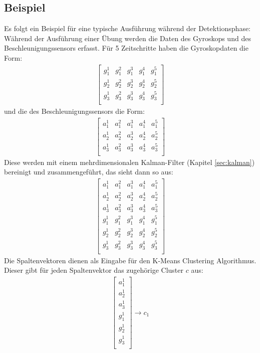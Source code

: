 \documentclass{article}
\begin{document}
\subsection{Beispiel}
Es folgt ein Beispiel für eine typische Ausführung während der Detektionsphase:\\
Während der Ausführung einer Übung werden die Daten des Gyroskops und des Beschleunigungssensors erfasst.
Für 5 Zeitschritte haben die Gyroskopdaten die Form:
\begin{align*}
\left[\begin{array}{rrrrr}
g_{1}^1 & g_{1}^2 & g_{1}^3 & g_{1}^4 & g_{1}^5 \\
g_{2}^1 & g_{2}^2 & g_{2}^3 & g_{2}^4 & g_{2}^5 \\
g_{3}^1 & g_{3}^2 & g_{3}^3 & g_{3}^4 & g_{3}^5 \\
\end{array}\right]
\end{align*}
und die des Beschleunigungssensors die Form:
\begin{align*}
\left[\begin{array}{rrrrr}
a_{1}^1 & a_{1}^2 & a_{1}^3 & a_{1}^4 & a_{1}^5 \\
a_{2}^1 & a_{2}^2 & a_{2}^3 & a_{2}^4 & a_{2}^5 \\
a_{3}^1 & a_{3}^2 & a_{3}^3 & a_{3}^4 & a_{3}^5 \\
\end{array}\right]
\end{align*}
Diese werden mit einem mehrdimensionalen Kalman-Filter (Kapitel \ref{sec:kalman}) bereinigt und zusammengeführt, das sieht dann so aus:
\begin{align*}
\left[\begin{array}{rrrrr}
a_{1}^1 & a_{1}^2 & a_{1}^3 & a_{1}^4 & a_{1}^5 \\
a_{2}^1 & a_{2}^2 & a_{2}^3 & a_{2}^4 & a_{2}^5 \\
a_{3}^1 & a_{3}^2 & a_{3}^3 & a_{3}^4 & a_{3}^5 \\
g_{1}^1 & g_{1}^2 & g_{1}^3 & g_{1}^4 & g_{1}^5 \\
g_{2}^1 & g_{2}^2 & g_{2}^3 & g_{2}^4 & g_{2}^5 \\
g_{3}^1 & g_{3}^2 & g_{3}^3 & g_{3}^4 & g_{3}^5 \\
\end{array}\right]
\end{align*}
Die Spaltenvektoren dienen als Eingabe für den K-Means Clustering Algorithmus.
Dieser gibt für jeden Spaltenvektor das zugehörige Cluster $c$ aus:
\begin{align*}
\left[\begin{array}{r}
a_{1}^1\\
a_{2}^1\\
a_{3}^1\\
g_{1}^1\\
g_{2}^1\\
g_{3}^1\\
\end{array}\right]
\rightarrow c_1
\end{align*}
\end{document}
